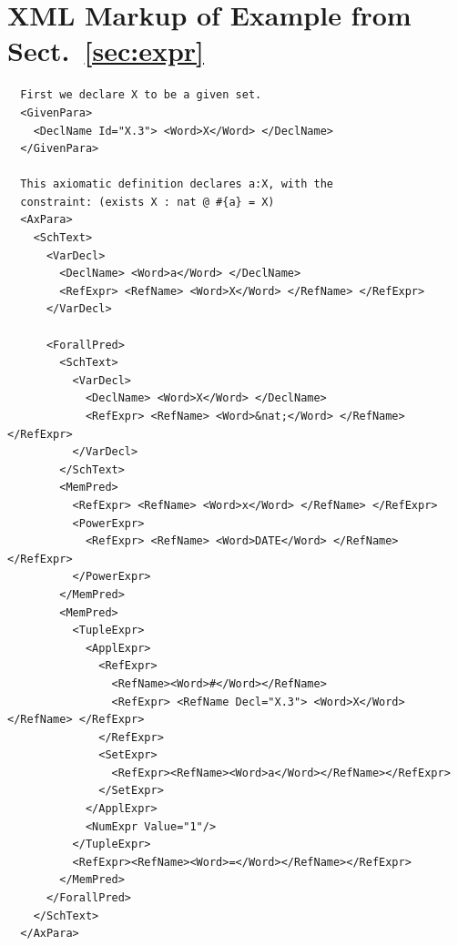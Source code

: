 \documentclass{llncs}  %
\begin{document}
\section{XML Markup of Example from Sect.~\ref{sec:expr}}
\begin{small}
\begin{verbatim}
  First we declare X to be a given set. 
  <GivenPara>
    <DeclName Id="X.3"> <Word>X</Word> </DeclName>
  </GivenPara>

  This axiomatic definition declares a:X, with the
  constraint: (exists X : nat @ #{a} = X)
  <AxPara>
    <SchText>
      <VarDecl>
        <DeclName> <Word>a</Word> </DeclName>
        <RefExpr> <RefName> <Word>X</Word> </RefName> </RefExpr>
      </VarDecl>

      <ForallPred>
        <SchText>
          <VarDecl>
            <DeclName> <Word>X</Word> </DeclName>
            <RefExpr> <RefName> <Word>&nat;</Word> </RefName> </RefExpr>
          </VarDecl>
        </SchText>
        <MemPred>
          <RefExpr> <RefName> <Word>x</Word> </RefName> </RefExpr>
          <PowerExpr>
            <RefExpr> <RefName> <Word>DATE</Word> </RefName> </RefExpr>
          </PowerExpr>
        </MemPred>
        <MemPred>
          <TupleExpr>
            <ApplExpr>
              <RefExpr>
                <RefName><Word>#</Word></RefName>
                <RefExpr> <RefName Decl="X.3"> <Word>X</Word> </RefName> </RefExpr>
              </RefExpr>
              <SetExpr>
                <RefExpr><RefName><Word>a</Word></RefName></RefExpr>
              </SetExpr>
            </ApplExpr>
            <NumExpr Value="1"/>
          </TupleExpr>
          <RefExpr><RefName><Word>=</Word></RefName></RefExpr>
        </MemPred>
      </ForallPred>
    </SchText>
  </AxPara>
\end{verbatim}
\end{small}
\end{document}
